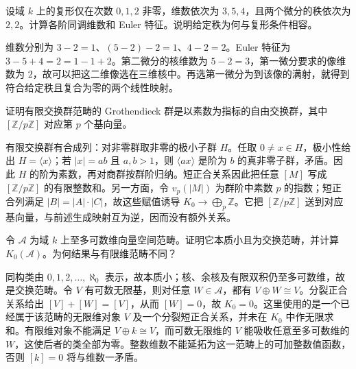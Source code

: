 \begin{exercise}\label{b4:ex:05-euler-ranks}
	设域 \(k\) 上的复形仅在次数 \(0,1,2\) 非零，维数依次为 \(3,5,4\)，且两个微分的秩依次为 \(2,2\)。计算各阶同调维数和 Euler 特征。说明给定秩为何与复形条件相容。
\end{exercise}
\begin{solution}
	维数分别为 \(3-2=1\)、\((5-2)-2=1\)、\(4-2=2\)。Euler 特征为 \(3-5+4=2=1-1+2\)。第二微分的核维数为 \(5-2=3\)，第一微分要求的像维数为 \(2\)，故可以把这二维像选在三维核中。再选第一微分为到该像的满射，就得到符合给定秩且复合为零的两个线性映射。
\end{solution}

\begin{exercise}\label{b4:ex:05-finite-groups-kzero}
	证明有限交换群范畴的 Grothendieck 群是以素数为指标的自由交换群，其中 \([\mathbb Z/p\mathbb Z]\) 对应第 \(p\) 个基向量。
\end{exercise}
\begin{solution}
	有限交换群有合成列：对非零群取非零的极小子群 \(H\)。任取 \(0\ne x\in H\)，极小性给出 \(H=\langle x\rangle\)；若 \(|x|=ab\) 且 \(a,b>1\)，则 \(\langle ax\rangle\) 是阶为 \(b\) 的真非零子群，矛盾。因此 \(H\) 的阶为素数，再对商群按群阶归纳。短正合关系因此把任意 \([M]\) 写成 \([\mathbb Z/p\mathbb Z]\) 的有限整数和。另一方面，令 \(v_p(|M|)\) 为群阶中素数 \(p\) 的指数；短正合列满足 \(|B|=|A|\cdot|C|\)，故这些赋值诱导 \(K_0\to\bigoplus_p\mathbb Z\)。它把 \([\mathbb Z/p\mathbb Z]\) 送到对应基向量，与前述生成映射互为逆，因而没有额外关系。
\end{solution}

\begin{exercise}\label{b4:ex:05-countable-swindle}
	令 \(\mathcal A\) 为域 \(k\) 上至多可数维向量空间范畴。证明它本质小且为交换范畴，并计算 \(K_0(\mathcal A)\)。为何结果与有限维范畴不同？
\end{exercise}
\begin{solution}
	同构类由 \(0,1,2,\ldots,\aleph_0\) 表示，故本质小；核、余核及有限双积仍至多可数维，故是交换范畴。令 \(V\) 有可数无限基，则对任意 \(W\in\mathcal A\)，都有 \(V\oplus W\cong V\)。分裂正合关系给出 \([V]+[W]=[V]\)，从而 \([W]=0\)，故 \(K_0=0\)。这里使用的是一个已经属于该范畴的无限维对象 \(V\) 及一个分裂短正合关系，并未在 \(K_0\) 中作无限求和。有限维对象不能满足 \(V\oplus k\cong V\)，而可数无限维的 \(V\) 能吸收任意至多可数维的 \(W\)，这使后者的类全部为零。整数维数不能延拓为这一范畴上的可加整数值函数，否则 \([k]=0\) 将与维数一矛盾。
\end{solution}

